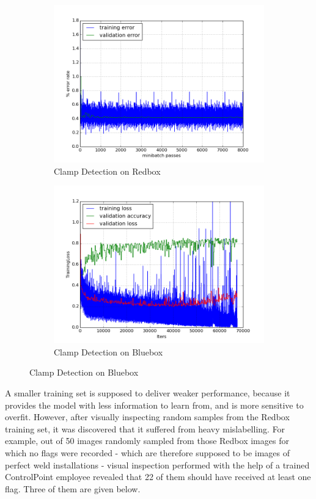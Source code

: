 \documentclass[a4paper,11pt]{article}
\begin{document}
\begin{figure}[h!]
	\centering
	\begin{subfigure}{.5\textwidth}
  		\centering
		\includegraphics[scale=0.4]{images/increase_test_precision.png}
		\caption{Clamp Detection on Redbox}
	\end{subfigure}%
	\begin{subfigure}{.5\textwidth}
  		\centering
		\includegraphics[scale=0.4]{images/plot_clampdet_tl_wout.png}
		\caption{Clamp Detection on Bluebox}
	\end{subfigure}
\end{figure}

A smaller training set is supposed to deliver weaker performance, because it provides the model with less information to learn from, and is more sensitive to overfit. However, after visually inspecting random samples from the Redbox training set, it was discovered that it suffered from heavy mislabelling. For example, out of 50 images randomly sampled from those Redbox images for which no flags were recorded - which are therefore supposed to be images of perfect weld installations - visual inspection performed with the help of a trained ControlPoint employee revealed that 22 of them should have received at least one flag. Three of them are given below.
\end{document}
